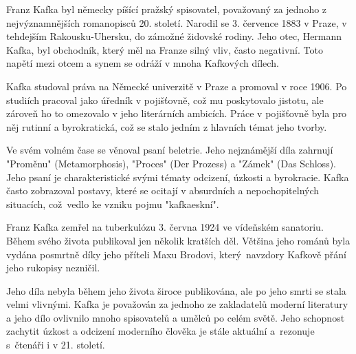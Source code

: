 \documentclass{article}
\begin{document}
	Franz Kafka byl německy píšící pražský spisovatel, považovaný za jednoho z nejvýznamnějších romanopisců 20. století. Narodil se 3. července 1883 v Praze, v tehdejším Rakousku-Uhersku, do zámožné židovské rodiny. Jeho otec, Hermann Kafka, byl obchodník, který měl na Franze silný vliv, často negativní. Toto napětí mezi otcem a synem se odráží v mnoha Kafkových dílech.
	
	Kafka studoval práva na Německé univerzitě v Praze a promoval v roce 1906. Po studiích pracoval jako úředník v pojišťovně, což mu poskytovalo jistotu, ale zároveň ho to omezovalo v jeho literárních ambicích. Práce v pojišťovně byla pro něj rutinní a byrokratická, což se stalo jedním z hlavních témat jeho tvorby.
	
	Ve svém volném čase se věnoval psaní beletrie. Jeho nejznámější díla zahrnují "Proměnu" (Metamorphosis), "Proces" (Der Prozess) a "Zámek" (Das Schloss). Jeho psaní je charakteristické svými tématy odcizení, úzkosti a byrokracie. Kafka často zobrazoval postavy, které se ocitají v absurdních a nepochopitelných situacích, což~vedlo ke vzniku pojmu "kafkaeskní".
	
	Franz Kafka zemřel na tuberkulózu 3. června 1924 ve vídeňském sanatoriu. Během svého života publikoval jen několik kratších děl. Většina jeho románů byla vydána posmrtně díky jeho příteli Maxu Brodovi, který~navzdory Kafkově přání jeho rukopisy nezničil.
	
	Jeho díla nebyla během jeho života široce publikována, ale po jeho smrti se stala velmi vlivnými. Kafka je považován za jednoho ze zakladatelů moderní literatury a jeho dílo ovlivnilo mnoho spisovatelů a umělců po celém světě. Jeho schopnost zachytit úzkost a odcizení moderního člověka je stále aktuální a~rezonuje s~čtenáři i v 21. století.
\end{document}
